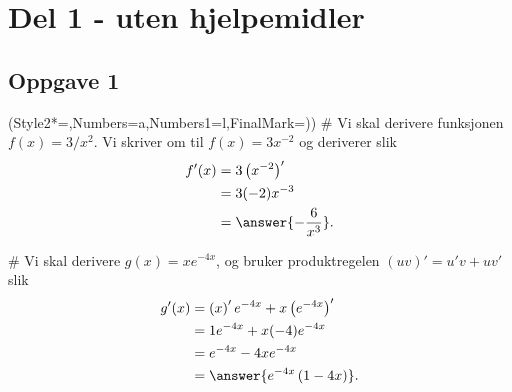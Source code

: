 


\newcommand{\fagkode}{S2}
\newcommand{\semesteraar}{våren 2014}
\newcommand{\forfatter}{Tommy O.}
\newcommand{\dokumenttittel}{Løsningsforslag -- Eksamen \fagkode, \semesteraar}


\newcommand{\logonavn}{figs/metis_akademiet_privatistskole_doclogo.png}




\section*{Del 1 - uten hjelpemidler}
\subsection*{Oppgave 1}
\begin{easylist}[enumerate]
\ListProperties(Style2*=,Numbers=a,Numbers1=l,FinalMark={)})
# Vi skal derivere funksjonen $f(x) = 3/x^2$. 
Vi skriver om til $f(x) = 3x^{-2}$ og deriverer slik
\begin{align*}
	f'(x) &= 3 \left(x^{-2}\right)' \\
	      & = 3 (-2)x^{-3} \\
	      & = \answer{-\frac{6}{x^3}}.
\end{align*}


# Vi skal derivere $g(x) = xe^{-4x}$, og bruker produktregelen
$(uv)' = u'v + uv'$ slik
\begin{align*}
	g'(x) &= \left(x \right)' e^{-4x} +x \left( e^{-4x} \right)' \\
	& = 1 e^{-4x} + x (-4) e^{-4x}  \\
	& = e^{-4x} -4x e^{-4x}  \\
	& =  \answer{e^{-4x} \left( 1 - 4x\right) }.
\end{align*}
\end{easylist}


